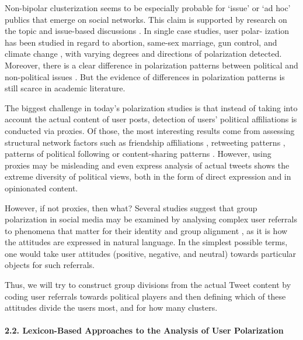 Non-bipolar clusterization seems to be especially probable for ‘issue’ or ‘ad hoc’ publics \cite{BrunsBurgess,Papacharissi} that emerge on social networks. This claim is supported by research on the topic and issue-based discussions \cite{ElgesemSteskalDiakopoulos}. In single case studies, user polar- ization has been studied in regard to abortion, same-sex marriage, gun control, and climate change \cite{Elgesem,CalaisGuerraMeiraJrCardie,YardiBoyd}, with varying degrees and directions of polarization detected. Moreover, there is a clear difference in polarization patterns between political and non-political issues \cite{BarberaJostNagler}. But the evidence of differences in polarization patterns is still scarce in academic literature.

The biggest challenge in today’s polarization studies is that instead of taking into account the actual content of user posts, detection of users’ political affiliations is conducted via proxies. Of those, the most interesting results come from assessing structural network factors such as friendship affiliations \cite{BarberaRivero}, retweeting patterns \cite{CalaisGuerraVelosoMeiraJr}, patterns of political following \cite{BarberaJostNagler,Rivero} or content-sharing patterns \cite{AdamicGlance,BakshyMessingAdamic,ColleoniRozzaArvidsson,Elgesem}. However, using proxies may be misleading \cite{AdamicGlance} and even express analysis of actual tweets shows the extreme diversity of political views, both in the form of direct expression and in opinionated content.

However, if not proxies, then what? Several studies suggest that group polarization in social media may be examined by analysing complex user referrals to phenomena that matter for their identity and group alignment \cite{Evolvi}, as it is how the attitudes are expressed in natural language. In the simplest possible terms, one would take user attitudes (positive, negative, and neutral) towards particular objects for such referrals.

Thus, we will try to construct group divisions from the actual Tweet content by coding user referrals towards political players and then defining which of these attitudes divide the users most, and for how many clusters.

\paragraph{2.2. Lexicon-Based Approaches to the Analysis of User Polarization}


